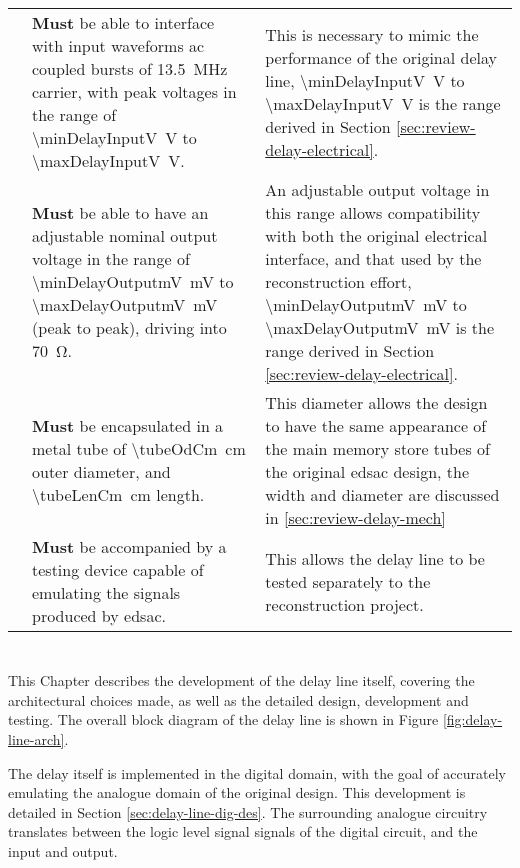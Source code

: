 \begin{longtable}{r  >{\raggedright}p{}  >{\raggedright}p{} }
	{specNo}\thespecNo\label{itm:spec-skew-input-v} & \textbf{Must} be able to interface with input waveforms \gls{ac} coupled bursts of \SI{13.5}{\mega\hertz} carrier, with peak voltages in the range of \SI{\minDelayInputV}{\volt} to \SI{\maxDelayInputV}{\volt}. & This is necessary to mimic the performance of the original delay line, \SI{\minDelayInputV}{\volt} to \SI{\maxDelayInputV}{\volt} is the range derived in Section \ref{sec:review-delay-electrical}. \tabularnewline
	
	{specNo}\thespecNo\label{itm:spec-skew-output-v} & \textbf{Must} be able to have an adjustable nominal output voltage in the range of \SI{\minDelayOutputmV}{\milli\volt} to \SI{\maxDelayOutputmV}{\milli\volt} (peak to peak), driving into \SI{70}{\ohm}. & An adjustable output voltage in this range allows compatibility with both the original electrical interface, and that used by the reconstruction effort, \SI{\minDelayOutputmV}{\milli\volt} to \SI{\maxDelayOutputmV}{\milli\volt} is the range derived in Section \ref{sec:review-delay-electrical}. \tabularnewline
	
	{specNo}\thespecNo\label{itm:spec-phys-size} & \textbf{Must} be encapsulated in a metal tube of \SI{\tubeOdCm}{\centi\metre} outer diameter, and \SI{\tubeLenCm}{\centi\metre} length. & This diameter allows the design to have the same appearance of the main memory store tubes of the original \gls{edsac} design, the width and diameter are discussed in \ref{sec:review-delay-mech} \tabularnewline
	
	{specNo}\thespecNo\label{itm:spec-testing} & \textbf{Must} be accompanied by a testing device capable of emulating the signals produced by \gls{edsac}. & This allows the delay line to be tested separately to the reconstruction project. \tabularnewline
	
	
\end{longtable}

\chapter{}

This Chapter describes the development of the delay line itself, covering the architectural choices made, as well as the detailed design, development and testing. The overall block diagram of the delay line is shown in Figure \ref{fig:delay-line-arch}.

The delay itself is implemented in the digital domain, with the goal of accurately emulating the analogue domain of the original design. This development is detailed in Section \ref{sec:delay-line-dig-des}. The surrounding analogue circuitry translates between the logic level signal signals of the digital circuit, and the input and output.

